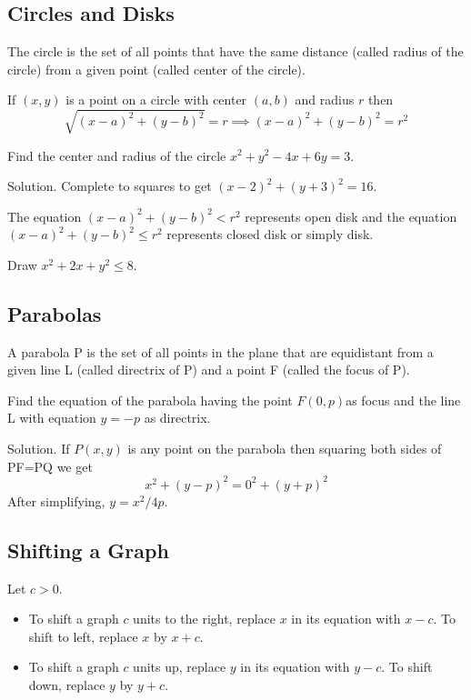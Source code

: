 \documentclass[../main.tex]{subfiles}
\begin{document}
\subsection*{Circles and Disks}
The circle is the set of all points that have the same distance (called radius of the circle) from a given point (called center of the circle).

If $(x,y)$ is a point on a circle with center $(a,b)$ and radius $r$ then
\[
  \sqrt{(x-a)^2+(y-b)^2} = r \implies
  (x-a)^2+(y-b)^2 = r^2
\]

\begin{example}
  Find the center and radius of the circle $x^2+y^2-4x+6y=3$.

  Solution. Complete to squares to get $(x-2)^2+(y+3)^2=16$.
\end{example}

The equation $(x-a)^2+(y-b)^2 < r^2$ represents open disk and the equation $(x-a)^2+(y-b)^2 \le r^2$ represents closed disk or simply disk.
\begin{example}
  Draw $x^2+2x+y^2 \le 8$.
\end{example}

\subsection*{Parabolas}
A parabola P is the set of all points in the plane that are equidistant from a given line L (called directrix of P) and a point F (called the focus of P).
\begin{figure}[H]
  \centering
  
\end{figure}

\begin{example}
  Find the equation of the parabola having the point $F(0,p)$as focus and the line L with equation $y=-p$ as directrix.

  Solution. If $P(x,y)$ is any point on the parabola then squaring both sides of PF=PQ we get
  \[
    x^2 + (y-p)^2 = 0^2 + (y+p)^2
  \]
  After simplifying, $y=x^2/4p$.
\end{example}

\subsection*{Shifting a Graph}
Let $c>0$.

\begin{itemize}
  \item To shift a graph $c$ units to the right, replace $x$ in its equation with $x-c$. To shift to left, replace $x$ by $x+c$.
  \item To shift a graph $c$ units up, replace $y$ in its equation with $y-c$. To shift down, replace $y$ by $y+c$.
\end{itemize}

\begin{figure}[H]
  \centering
  
\end{figure}
\end{document}
